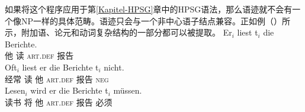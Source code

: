 如果将这个程序应用于第\ref{Kapitel-HPSG}章中的HPSG\indexhpsgc 语法，那么语迹就不会有一个像NP一样的具体范畴。语迹只会与一个非中心语子结点兼容。正如例（）所示，附加语、论元和动词复杂结构的一部分都可以被提取。
\eal
\ex 
\gll Er$_i$ liest t$_i$ die Berichte.\\
	 他 读 {}    \textsc{art}.\textsc{def} 报告\\
\ex 
\gll Oft$_i$ liest er die Berichte t$_i$ nicht.\\
	 经常 读 他 \textsc{art}.\textsc{def} 报告 {} \textsc{neg}\\
\ex 
\gll Lesen$_i$ wird er die Berichte t$_i$ müssen.\\
	 读书 将 他 \textsc{art}.\textsc{def} 报告 {} 必须\\
\zl

